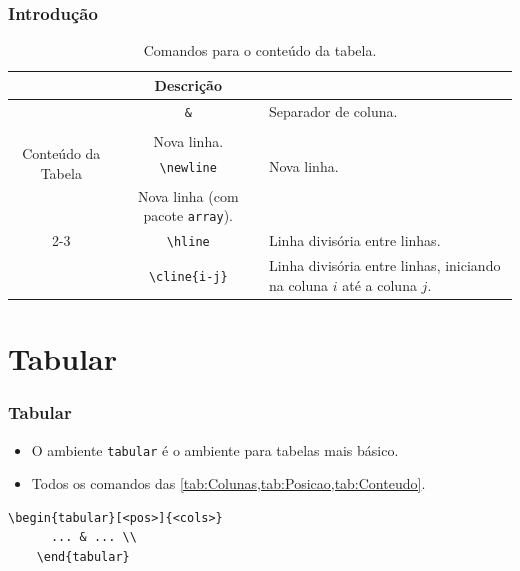 \documentclass[brazilian]{beamer}
\begin{document}
\begin{frame}[fragile]
  \frametitle{Introdução}
  \footnotesize

  \begin{table}
    \caption{Comandos para o conteúdo da tabela.}
    \label{tab:Conteudo}
    \begin{tabular}[c]{c|c|m{5cm}}
      \firsthline
      \multicolumn{2}{c}{Comando}           & Descrição                                                                                                                     \\ \hline
      \multirow{6}{2cm}{Conteúdo da Tabela} & \texttt{\&}                                     & Separador de coluna.                                                        \\ \cline{2-3}
                                            & \lstinline[style=myStyleLatex]!\\!              & Nova linha.                                                                 \\ \cline{2-3}
                                            & \lstinline[style=myStyleLatex]!\newline!        & Nova linha.                                                                 \\ \cline{2-3}
                                            & \lstinline[style=myStyleLatex]!\tabularnewline! & Nova linha (com pacote \texttt{array}).                                     \\ \cline{2-3}
                                            & \lstinline[style=myStyleLatex]!\hline!          & Linha divisória entre linhas.                                               \\ \cline{2-3}
                                            & \lstinline[style=myStyleLatex]!\cline{i-j}!     & Linha divisória entre linhas, iniciando na coluna \(i\) até a coluna \(j\). \\ \hline
    \end{tabular}
  \end{table}
\end{frame}

\section{Tabular}
\begin{frame}[fragile]
  \frametitle{Tabular}

  \begin{itemize}
    \item O ambiente \texttt{tabular} é o ambiente para tabelas mais básico.
    \item Todos os comandos das \cref{tab:Colunas,tab:Posicao,tab:Conteudo}.
  \end{itemize}
  \begin{lstlisting}[style=myStyleLatex]
    \begin{tabular}[<pos>]{<cols>}
      ... & ... \\ 
    \end{tabular}
  \end{lstlisting}
\end{frame}
\end{document}
